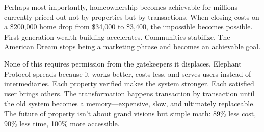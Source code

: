 Perhaps most importantly, homeownership becomes achievable for millions currently priced out not by properties but by transactions. When closing costs on a \$200,000 home drop from \$34,000 to \$3,400, the impossible becomes possible. First-generation wealth building accelerates. Communities stabilize. The American Dream stops being a marketing phrase and becomes an achievable goal.

None of this requires permission from the gatekeepers it displaces. Elephant Protocol spreads because it works better, costs less, and serves users instead of intermediaries. Each property verified makes the system stronger. Each satisfied user brings others. The transformation happens transaction by transaction until the old system becomes a memory---expensive, slow, and ultimately replaceable. The future of property isn't about grand visions but simple math: 89\% less cost, 90\% less time, 100\% more accessible.